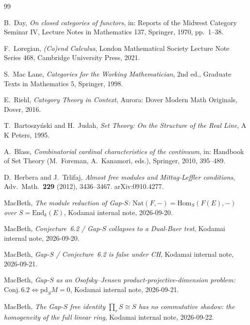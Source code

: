 \documentclass[11pt]{report}
\theoremstyle{plain}
\theoremstyle{definition}
\theoremstyle{remark}
\newcommand{\End}{\mathrm{End}}
\newcommand{\Hom}{\mathrm{Hom}}
\newcommand{\Nat}{\mathrm{Nat}}
\newcommand{\pd}{\mathrm{pd}}
\begin{document}
\begin{thebibliography}{99}

 B.~Day, \emph{On closed categories of functors}, in: Reports of the Midwest Category Seminar IV, Lecture Notes in Mathematics 137, Springer, 1970, pp.~1--38.

 F.~Loregian, \emph{(Co)end Calculus}, London Mathematical Society Lecture Note Series 468, Cambridge University Press, 2021.

 S.~Mac Lane, \emph{Categories for the Working Mathematician}, 2nd ed., Graduate Texts in Mathematics 5, Springer, 1998.

 E.~Riehl, \emph{Category Theory in Context}, Aurora: Dover Modern Math Originals, Dover, 2016.

 T.~Bartoszy\'nski and H.~Judah, \emph{Set Theory: On the Structure of the Real Line}, A K Peters, 1995.

 A.~Blass, \emph{Combinatorial cardinal characteristics of the continuum}, in: Handbook of Set Theory (M.~Foreman, A.~Kanamori, eds.), Springer, 2010, 395--489.

 D.~Herbera and J.~Trlifaj, \emph{Almost free modules and Mittag-Leffler conditions}, Adv.\ Math.\ \textbf{229} (2012), 3436--3467. arXiv:0910.4277.

 MacBeth, \emph{The module reduction of Gap-$S$: $\Nat(F,-)=\Hom_S(F(E),-)$ over $S=\End_k(E)$}, Kodamai internal note, 2026-09-20.

 MacBeth, \emph{Conjecture~6.2 / Gap-$S$ collapses to a Dual-Baer test}, Kodamai internal note, 2026-09-20.

 MacBeth, \emph{Gap-$S$ / Conjecture~6.2 is false under CH}, Kodamai internal note, 2026-09-21.

 MacBeth, \emph{Gap-$S$ as an Osofsky--Jensen product-projective-dimension problem: $\mathrm{Conj.}\,6.2\Leftrightarrow\pd_S M=0$}, Kodamai internal note, 2026-09-21.

 MacBeth, \emph{The Gap-$S$ free identity $\prod_r S\cong S$ has no commutative shadow: the homogeneity of the full linear ring}, Kodamai internal note, 2026-09-22.


\end{thebibliography}
\end{document}

